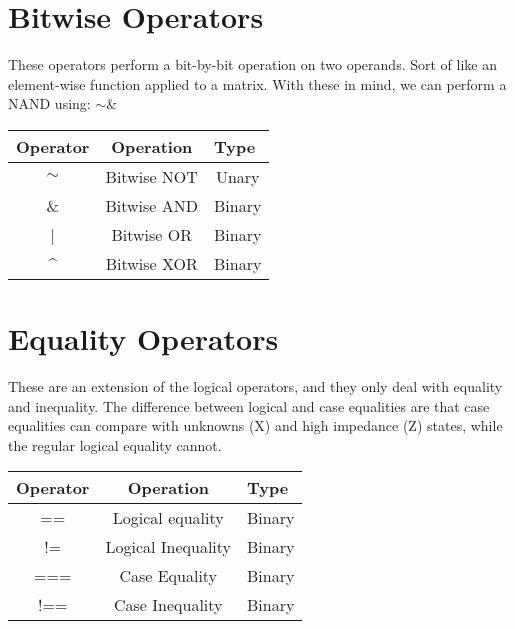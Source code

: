 \section{Bitwise Operators}
These operators perform a bit-by-bit operation on two operands. Sort of like an element-wise function applied to a matrix.
With these in mind, we can perform a NAND using: $\sim$\&
\begin{table}[h] \centering
	\begin{tabular}{ccc}
		\cellcolor[HTML]{FFFFFF}Operator & \cellcolor[HTML]{FFFFFF}Operation & \multicolumn{1}{l}{Type} \\ \hline
		$\sim$                           & Bitwise NOT                       & Unary                    \\
		\&                               & Bitwise AND                       & Binary                   \\
		|                                & Bitwise OR                        & Binary                   \\
		\textasciicircum{}               & Bitwise XOR                       & Binary                  
	\end{tabular}
\end{table}

\section{Equality Operators}
These are an extension of the logical operators, and they only deal with equality and inequality. The difference between logical and case equalities are that case equalities can compare with unknowns (X) and high impedance (Z) states, while the regular logical equality cannot.
\begin{table}[h] \centering
	\begin{tabular}{ccc}
		\cellcolor[HTML]{FFFFFF}Operator & \cellcolor[HTML]{FFFFFF}Operation & \multicolumn{1}{l}{Type} \\ \hline
		==                          & Logical equality                      & Binary                    \\
		!=                             & Logical Inequality                      & Binary                   \\
		===                             & Case Equality                      & Binary                   \\
		!==              & Case Inequality                   & Binary                  
	\end{tabular}
\end{table}

